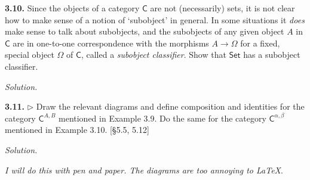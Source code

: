 \documentclass[14pt,parskip=full]{scrartcl}
\newcommand{\exercise}[3]{
\noindent
\textbf{#1.} #2

\noindent
\textit{Solution.}{\let\tpar\par \let\par\relax #3}
}
\begin{document}
{\def \C {\mathsf{C}} \def \Set {\mathsf{Set}}
\exercise
{3.10}{Since the objects of a category $\C$ are not (necessarily) sets, it is
not clear how to make sense of a notion of `subobject' in general. In some
situations it \textit{does} make sense to talk about subobjects, and the
subobjects of any given object $A$ in $\C$ are in one-to-one correspondence with
the morphisms $A\to\Omega$ for a fixed, special object $\Omega$ of $\C$, called
a \textit{subobject classifier}. Show that $\Set$ has a subobject classifier.}{



}}

{\def \C {\mathsf{C}}
\exercise
{3.11}{$\rhd$ Draw the relevant diagrams and define composition and identities
for the category $\C^{A,B}$ mentioned in Example 3.9. Do the same for the
category $\C^{\alpha,\beta}$ mentioned in Example 3.10. [\S5.5, 5.12]}{

\textit{I will do this with pen and paper. The diagrams are too annoying to
\LaTeX}.

}}
\end{document}
